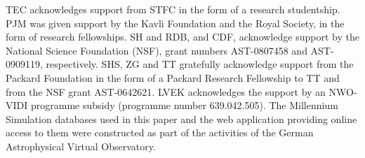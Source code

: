 TEC acknowledges support from STFC in the form of a research studentship.
%
PJM was given support by the Kavli Foundation and the Royal 
Society, in the form of research fellowships.
%
%
SH and RDB, and CDF, acknowledge support by the National Science Foundation
(NSF), grant numbers AST-0807458 and  AST-0909119, respectively.
%
SHS, ZG  and TT gratefully acknowledge support from the Packard Foundation in
the form of a Packard Research Fellowship to TT and from the 
NSF grant AST-0642621.
% 
LVEK acknowledges the support by an NWO-VIDI programme subsidy
(programme number 639.042.505).
%
%
The Millennium Simulation databases used in this paper and the web application
providing online access to them were constructed as part of the activities of
the German Astrophysical Virtual Observatory.
